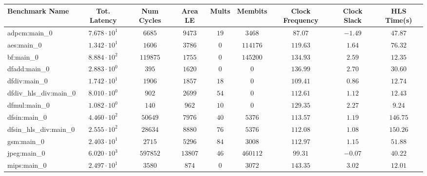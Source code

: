 \begin{tabular}{|l|c|c|c|c|c|c|c|c|}
\hline
Benchmark Name          & Tot. Latency           & Num Cycles & Area LE   & Mults   & Membits    & Clock Frequency & Clock Slack & HLS Time(s) \\
\hline
adpcm:main\_0           & $ 7.678 \cdot 10^{1} $ & $ 6685   $ & $ 9473  $ & $ 19  $ & $ 3468   $ & $ 87.07       $ & $ -1.49   $ & $ 47.87   $ \\
aes:main\_0             & $ 1.342 \cdot 10^{1} $ & $ 1606   $ & $ 3786  $ & $ 0   $ & $ 114176 $ & $ 119.63      $ & $ 1.64    $ & $ 76.32   $ \\
bf:main\_0              & $ 8.884 \cdot 10^{2} $ & $ 119875 $ & $ 1755  $ & $ 0   $ & $ 145200 $ & $ 134.93      $ & $ 2.59    $ & $ 12.35   $ \\
dfadd:main\_0           & $ 2.883 \cdot 10^{0} $ & $ 395    $ & $ 1620  $ & $ 0   $ & $ 0      $ & $ 136.99      $ & $ 2.70    $ & $ 30.60   $ \\
dfdiv:main\_0           & $ 1.742 \cdot 10^{1} $ & $ 1906   $ & $ 1857  $ & $ 18  $ & $ 0      $ & $ 109.41      $ & $ 0.86    $ & $ 12.74   $ \\
dfdiv\_hls\_div:main\_0 & $ 8.010 \cdot 10^{0} $ & $ 902    $ & $ 2699  $ & $ 54  $ & $ 0      $ & $ 112.61      $ & $ 1.12    $ & $ 12.43   $ \\
dfmul:main\_0           & $ 1.082 \cdot 10^{0} $ & $ 140    $ & $ 962   $ & $ 10  $ & $ 0      $ & $ 129.35      $ & $ 2.27    $ & $ 9.24    $ \\
dfsin:main\_0           & $ 4.460 \cdot 10^{2} $ & $ 50649  $ & $ 7976  $ & $ 40  $ & $ 5376   $ & $ 113.57      $ & $ 1.19    $ & $ 146.75  $ \\
dfsin\_hls\_div:main\_0 & $ 2.555 \cdot 10^{2} $ & $ 28634  $ & $ 8880  $ & $ 76  $ & $ 5376   $ & $ 112.08      $ & $ 1.08    $ & $ 150.26  $ \\
gsm:main\_0             & $ 2.403 \cdot 10^{1} $ & $ 2715   $ & $ 5296  $ & $ 84  $ & $ 3008   $ & $ 112.97      $ & $ 1.15    $ & $ 51.88   $ \\
jpeg:main\_0            & $ 6.020 \cdot 10^{3} $ & $ 597852 $ & $ 13807 $ & $ 46  $ & $ 460112 $ & $ 99.31       $ & $ -0.07   $ & $ 40.22   $ \\
mips:main\_0            & $ 2.497 \cdot 10^{1} $ & $ 3580   $ & $ 874   $ & $ 0   $ & $ 3072   $ & $ 143.35      $ & $ 3.02    $ & $ 12.01   $ \\

\end{tabular}

